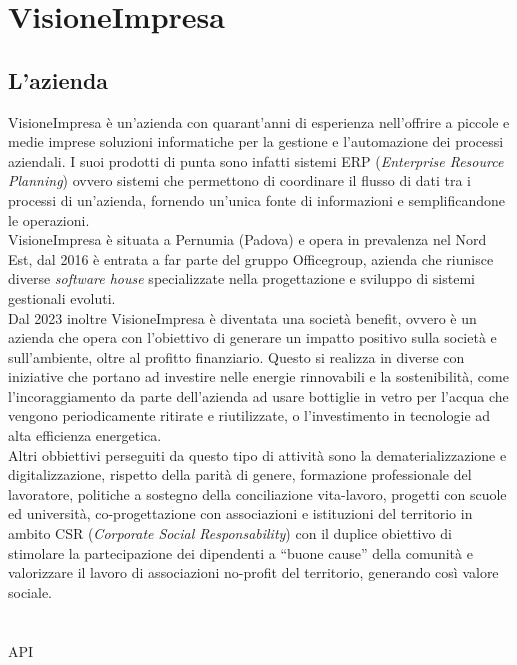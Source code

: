 \chapter{VisioneImpresa}\label{chap:VisioneImpresa}

\section{L'azienda}
VisioneImpresa è un'azienda con quarant'anni di esperienza nell'offrire a piccole e medie imprese soluzioni informatiche per la 
gestione e l'automazione dei processi aziendali. I suoi prodotti di punta sono infatti sistemi ERP (\textit{Enterprise 
Resource Planning}) ovvero sistemi che permettono di coordinare il flusso di dati tra i processi di un'azienda, fornendo un'unica fonte di 
informazioni e semplificandone le operazioni.\\
VisioneImpresa è situata a Pernumia (Padova) e opera in prevalenza nel Nord Est, dal 2016 è entrata a far parte del gruppo Officegroup, azienda 
che riunisce diverse \textit{software house} specializzate nella progettazione e sviluppo di sistemi gestionali evoluti.\\
Dal 2023 inoltre VisioneImpresa è diventata una società benefit, ovvero è un azienda che opera con l'obiettivo di generare un impatto positivo 
sulla società e sull'ambiente, oltre al profitto finanziario.
Questo si realizza in diverse con iniziative che portano ad investire nelle energie rinnovabili e la sostenibilità, come 
l'incoraggiamento da parte dell'azienda ad usare bottiglie in vetro per l'acqua che vengono periodicamente ritirate e 
riutilizzate, o l'investimento in tecnologie ad alta efficienza energetica.\\
Altri obbiettivi perseguiti da questo tipo di attività sono la dematerializzazione e digitalizzazione, rispetto della parità di 
genere, formazione professionale del lavoratore, politiche a sostegno della conciliazione vita-lavoro, progetti con scuole ed 
università, co-progettazione con associazioni e istituzioni del territorio in ambito CSR 
(\textit{Corporate Social Responsability}) con il duplice obiettivo di stimolare la partecipazione dei dipendenti a 
“buone cause” della comunità e valorizzare il lavoro di associazioni no-profit del territorio, generando così valore sociale.
\\\\\\
API

